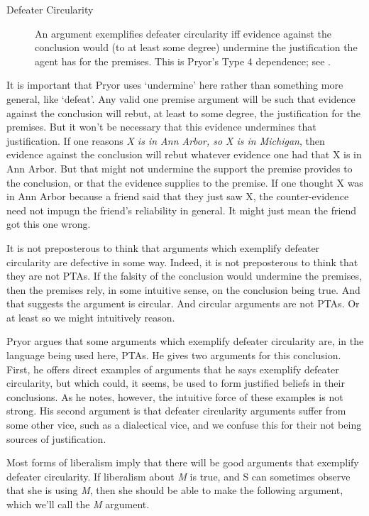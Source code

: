 \begin{description}
\item[Defeater Circularity]

An argument exemplifies defeater circularity iff evidence against the conclusion would (to at least some degree) undermine the justification the agent has for the premises. This is Pryor's Type 4 dependence; see \citet[359]{Pryor2004}.
\end{description}
It is important that Pryor uses `undermine' here rather than something more general, like `defeat'. Any valid one premise argument will be such that evidence against the conclusion will rebut, at least to some degree, the justification for the premises. But it won't be necessary that this evidence undermines that justification. If one reasons \emph{X is in Ann Arbor, so X is in Michigan}, then evidence against the conclusion will rebut whatever evidence one had that X is in Ann Arbor. But that might not undermine the support the premise provides to the conclusion, or that the evidence supplies to the premise. If one thought X was in Ann Arbor because a friend said that they just saw X, the counter-evidence need not impugn the friend's reliability in general. It might just mean the friend got this one wrong.

It is not preposterous to think that arguments which exemplify defeater circularity are defective in some way. Indeed, it is not preposterous to think that they are not PTAs. If the falsity of the conclusion would undermine the premises, then the premises rely, in some intuitive sense, on the conclusion being true. And that suggests the argument is circular. And circular arguments are not PTAs. Or at least so we might intuitively reason.

Pryor argues that some arguments which exemplify defeater circularity are, in the language being used here, PTAs. He gives two arguments for this conclusion. First, he offers direct examples of arguments that he says exemplify defeater circularity, but which could, it seems, be used to form justified beliefs in their conclusions. As he notes, however, the intuitive force of these examples is not strong. His second argument is that defeater circularity arguments suffer from some other vice, such as a dialectical vice, and we confuse this for their not being sources of justification.

Most forms of liberalism imply that there will be good arguments that exemplify defeater circularity. If liberalism about \emph{M} is true, and S can sometimes observe that she is using \emph{M}, then she should be able to make the following argument, which we'll call the \emph{M} argument.

